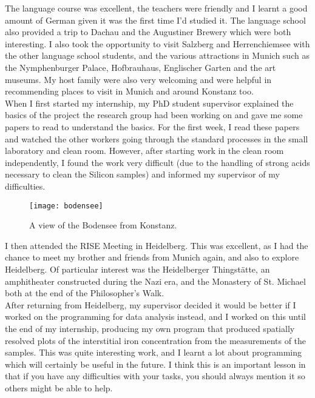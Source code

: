 \documentclass[final,a4paper,oneside,12pt]{article}
\begin{document}
The language course was excellent, the teachers were friendly and I learnt a good amount of German given it was the first time I'd studied it. The language school also provided a trip to Dachau and the Augustiner Brewery which were both interesting. I also took the opportunity to visit Salzberg and Herrenchiemsee with the other language school students, and the various attractions in Munich such as the Nymphenburger Palace, Hofbrauhaus, Englischer Garten and the art museums. My host family were also very welcoming and were helpful in recommending places to visit in Munich and around Konstanz too.\\

When I first started my internship, my PhD student supervisor explained the basics of the project the research group had been working on and gave me some papers to read to understand the basics. For the first week, I read these papers and watched the other workers going through the standard processes in the small laboratory and clean room. However, after starting work in the clean room independently, I found the work very difficult (due to the handling of strong acids necessary to clean the Silicon samples) and informed my supervisor of my difficulties.\\

\begin{center}
\begin{figure}[htp]
\centering
\texttt{[image: bodensee]}
\caption{\label{figure2} A view of the Bodensee from Konstanz.}
\end{figure}
\end{center}
I then attended the RISE Meeting in Heidelberg. This was excellent, as I had the chance to meet my brother and friends from Munich again, and also to explore Heidelberg. Of particular interest was the Heidelberger Thingstätte, an amphitheater constructed during the Nazi era, and the Monastery of St. Michael both at the end of the Philosopher's Walk.\\

After returning from Heidelberg, my supervisor decided it would be better if I worked on the programming for data analysis instead, and I worked on this until the end of my internship, producing my own program that produced spatially resolved plots of the interstitial iron concentration from the measurements of the samples. This was quite interesting work, and I learnt a lot about programming which will certainly be useful in the future. I think this is an important lesson in that if you have any difficulties with your tasks, you should always mention it so others might be able to help.\\
\end{document}
